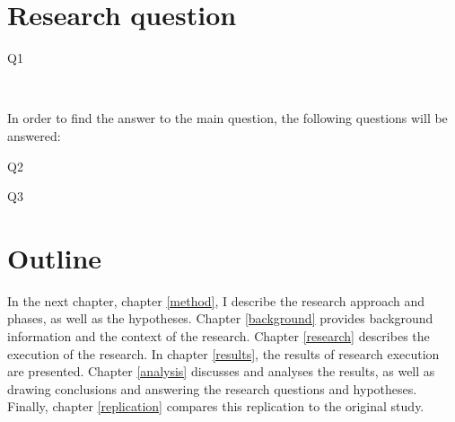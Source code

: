 \section{Research question}
\label{questions}

\begin{description}
	\item[Q1\label{itm:question_warningsigns}]
	\textit{\researchQuestion}\\[0.3cm]
\end{description}

\noindent
In order to find the answer to the main question, the following
questions will be answered:
\begin{description}
	\item[Q2\label{itm:question_patterns}] \textit{\subQuestionOne}
	\item[Q3\label{itm:question_successfailure}] \textit{\subQuestionTwo}
\end{description}


\section{Outline}

In the next chapter, chapter \ref{method}, I describe the research approach and
phases, as well as the hypotheses. Chapter \ref{background} provides background
information and the context of the research. Chapter \ref{research} describes
the execution of the research. In chapter \ref{results}, the results of research
execution are presented. Chapter \ref{analysis} discusses and analyses the
results, as well as drawing conclusions and answering the research questions
and hypotheses.
Finally, chapter \ref{replication} compares this replication to the original
study.

